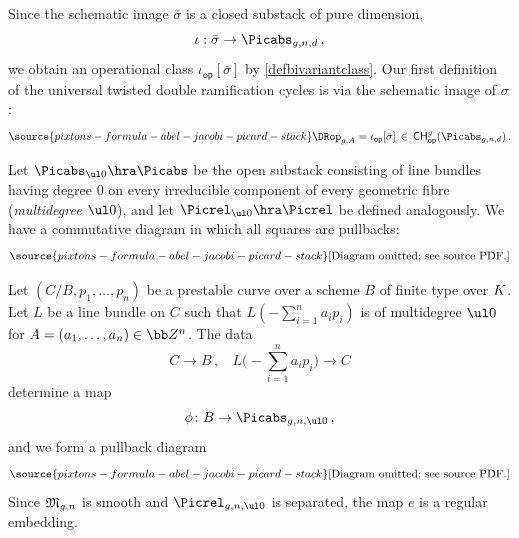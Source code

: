 Since the schematic image $\bar\sigma$ is a closed substack of pure dimension,
$$\iota:\bar\sigma\to \Picabs_{g,n,d}\, ,$$
we obtain an operational class $\iota_{\mathsf{op}}[\bar\sigma]$ by \cref{defbivariantclass}.
Our first definition of the universal twisted double ramification
cycles is via the schematic image of $\sigma$:
\begin{equation}\label{ddd111}
\source{pixtons-formula-abel-jacobi-picard-stack}
\DRop_{g,A} = \iota_{\mathsf{op}}[\bar\sigma] \, \in\,
\mathsf{CH}^g_{\mathsf{op}}(\Picabs_{g,n,d})
\, .
\end{equation}

Let $\Picabs_{\ul 0} \hra \Picabs$ be the open substack consisting of line bundles having degree 0 on every irreducible component of every geometric fibre (\emph{multidegree $\ul 0$}), and let $\Picrel_{\ul 0} \hra \Picrel$
be defined analogously. We have a commutative diagram in which all squares are pullbacks:
\begin{equation}\label{eq:multidegree0}
\source{pixtons-formula-abel-jacobi-picard-stack}
\text{[Diagram omitted; see source PDF.]}
\end{equation}

Let $(C/B, p_1, \dots, p_n)$ be a prestable curve over
a scheme $B$ of finite type over $K$.
Let $L$ be a line bundle on $C$ such that
$L(-\sum_{i=1}^n a_i p_i)$ is of multidegree $\ul 0$
for $A=(a_1,\ldots, a_n) \in \bb Z^n$.
The
data
$$C\to B\, , \ \ \ \ L\Big(-\sum_{i=1}^n a_i p_i\Big)\to C$$
determine a map $$\phi\colon B \to \Picabs_{g,n,\ul 0}\, ,$$
and we form a pullback diagram
\begin{equation}\label{dia:easy}
\source{pixtons-formula-abel-jacobi-picard-stack}
    \text{[Diagram omitted; see source PDF.]}
\end{equation}
Since $\frak M_{g,n}$ is smooth and $\Picrel_{g,n,\ul 0}$ is separated, the map $e$ is a regular embedding.


